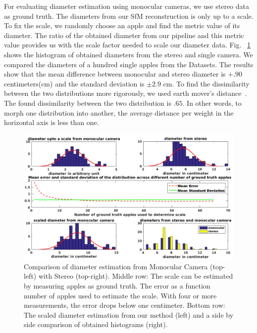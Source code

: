 For evaluating diameter estimation using monocular cameras, we use stereo data as ground truth. The diameters from our SfM reconstruction is only up to a scale. To fix the scale, we randomly choose an apple and find the metric value of its diameter. The ratio of the obtained diameter from our pipeline and this metric value provides us with the scale factor needed to scale our diameter data. Fig. ~\ref{fig:diamplots} shows the histogram of obtained diameters from the stereo and single camera. We compared the diameters of a hundred single apples from the Datasets. The results show that the mean difference between monocular and stereo diameter is $+.90$ centimeters(cm) and the standard deviation is $\pm 2.9$ cm. To find the dissimilarity between the two distributions more rigorously, we used earth mover's distance~\cite{rubner2000earth}. The found dissimilarity between the two distribution is $.65$. In other words, to morph one distribution into another, the average distance per weight in the horizontal axis is less than one.





\begin{figure}[!h]
\centering
\includegraphics[width=\textwidth]{figures/isfm/diameterfull1.png}
\caption[Comparison of diameter estimation from our method with a single camera with stereo.]{Comparison of diameter estimation from Monocular Camera (top-left) with Stereo (top-right). 
Middle row: The scale can be estimated by measuring apples as ground truth. The error as a function number of apples used to estimate 
the scale. With four or more measurements, the error drops below one centimeter. Bottom row:
The scaled diameter estimation from our method (left) and  a side by side comparison of obtained histograms (right).}
\label{fig:diamplots}
\end{figure}


